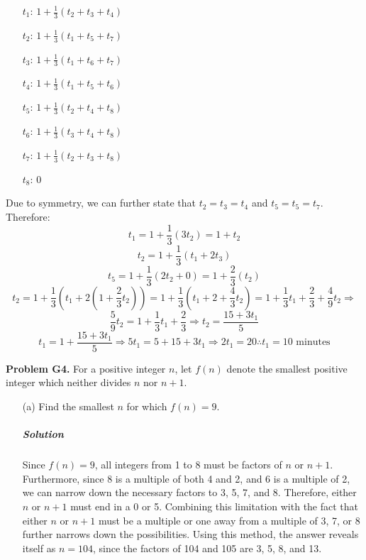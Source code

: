 \documentclass[a4paper]{amsart}
\begin{document}
\begin{flushleft}
\begin{enumerate}
\begin{center}
				\begin{itemize}
					\centering
					\item[$t_1$:] 
					$1 + \frac{1}{3}(t_2+t_3+t_4)$
					\item[$t_2$:] 
					$1 + \frac{1}{3}(t_1+t_5+t_7)$
					\item[$t_3$:] 
					$1 + \frac{1}{3}(t_1+t_6+t_7)$
					\item[$t_4$:] 
					$1 + \frac{1}{3}(t_1+t_5+t_6)$
					\item[$t_5$:] 
					$1 + \frac{1}{3}(t_2+t_4+t_8)$
					\item[$t_6$:] 
					$1 + \frac{1}{3}(t_3+t_4+t_8)$
					\item[$t_7$:] 
					$1 + \frac{1}{3}(t_2+t_3+t_8)$
					\item[$t_8$:] 
					$0$
				\end{itemize}
			\end{center}
		
			Due to symmetry, we can further state that $t_2=t_3=t_4$ and $t_5=t_5=t_7$. Therefore:
			\[ t_1=1+\frac{1}{3}(3t_2)=1+t_2 \]
			\[ t_2=1+\frac{1}{3}(t_1+2t_3) \]
			\[ t_5=1+\frac{1}{3}(2t_2+0)=1+\frac{2}{3}(t_2) \]
			\[ t_2=1+\frac{1}{3}(t_1+2(1+\frac{2}{3}t_2))=1+\frac{1}{3}(t_1+2+\frac{4}{3}t_2)=1+\frac{1}{3}t_1+\frac{2}{3}+\frac{4}{9}t_2\Rightarrow \]
			\[ \frac{5}{9}t_2=1+\frac{1}{3}t_1+\frac{2}{3}\Rightarrow t_2=\frac{15+3t_1}{5} \]
			\[ t_1=1+\frac{15+3t_1}{5}\Rightarrow 5t_1=5+15+3t_1\Rightarrow 2t_1=20\therefore t_1=10\text{ minutes} \]
		\end{enumerate}
	
		\textbf{Problem G4.} For a positive integer $n$, let $f(n)$ denote the smallest positive integer which neither divides $n$ nor $n+1$.
		
		\begin{enumerate}
			\item[(a)] Find the smallest $n$ for which $f(n)=9$.
			
			\subparagraph{\textbf{Solution}} Since $f(n)=9$, all integers from 1 to 8 must be factors of $n$ or $n+1$. Furthermore, since 8 is a multiple of both 4 and 2, and 6 is a multiple of 2, we can narrow down the necessary factors to 3, 5, 7, and 8. Therefore, either $n$ or $n+1$ must end in a 0 or 5. Combining this limitation with the fact that either $n$ or $n+1$ must be a multiple or one away from a multiple of 3, 7, or 8 further narrows down the possibilities. Using this method, the answer reveals itself as $n=104$, since the factors of 104 and 105 are 3, 5, 8, and 13.
			

\end{enumerate}
\end{flushleft}
\end{document}
